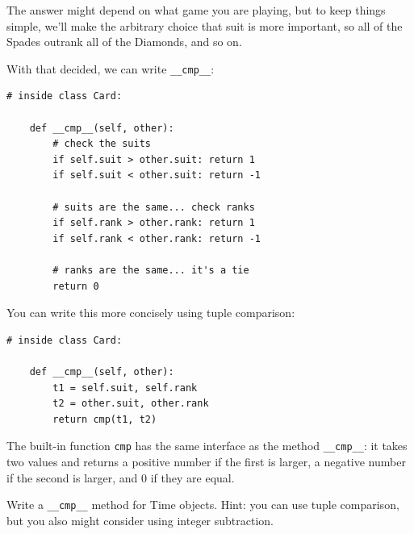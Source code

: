 \documentclass[10pt]{book}
\begin{document}
The answer might depend on what game you are playing, but to keep
things simple, we'll make the arbitrary choice that suit is more
important, so all of the Spades outrank all of the Diamonds,
and so on.


With that decided, we can write \verb"__cmp__":

\beforeverb
\begin{verbatim}
# inside class Card:

    def __cmp__(self, other):
        # check the suits
        if self.suit > other.suit: return 1
        if self.suit < other.suit: return -1

        # suits are the same... check ranks
        if self.rank > other.rank: return 1
        if self.rank < other.rank: return -1

        # ranks are the same... it's a tie
        return 0    
\end{verbatim}
\afterverb
%
You can write this more concisely using tuple comparison:


\beforeverb
\begin{verbatim}
# inside class Card:

    def __cmp__(self, other):
        t1 = self.suit, self.rank
        t2 = other.suit, other.rank
        return cmp(t1, t2)
\end{verbatim}
\afterverb
%
The built-in function {\tt cmp} has the same interface as
the method \verb"__cmp__": it takes two values and returns
a positive number if the first is larger, a negative number
if the second is larger, and 0 if they are equal.



\begin{ex}
Write a \verb"__cmp__" method for Time objects.  Hint: you
can use tuple comparison, but you also might consider using
integer subtraction.



\end{ex}
\end{document}
